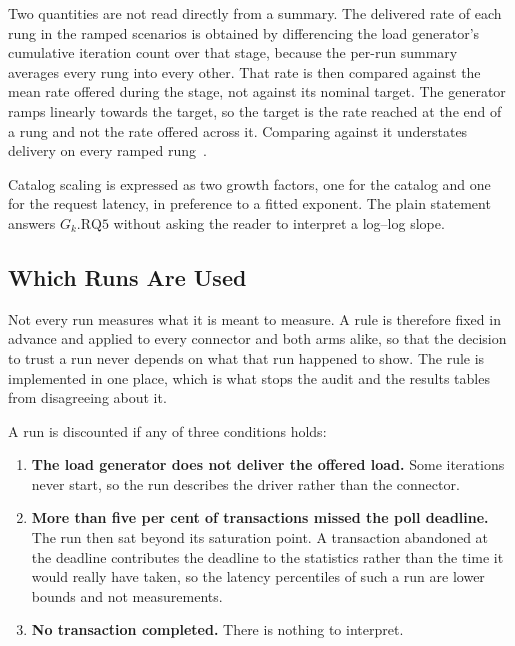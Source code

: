 \pagebreak

Two quantities are not read directly from a summary. The delivered rate of each rung in the ramped scenarios is obtained by differencing the load generator's cumulative iteration count over that stage, because the per-run summary averages every rung into every other. That rate is then compared against the mean rate offered during the stage, not against its nominal target. The generator ramps linearly towards the target, so the target is the rate reached at the end of a rung and not the rate offered across it. Comparing against it understates delivery on every ramped rung~\citep{k6docs}.

Catalog scaling is expressed as two growth factors, one for the catalog and one for the request latency, in preference to a fitted exponent. The plain statement answers $G_k.\text{RQ}5$ without asking the reader to interpret a log--log slope.

\subsection{Which Runs Are Used}\label{subsec:runs-used}

Not every run measures what it is meant to measure. A rule is therefore fixed in advance and applied to every connector and both arms alike, so that the decision to trust a run never depends on what that run happened to show. The rule is implemented in one place, which is what stops the audit and the results tables from disagreeing about it.

A run is discounted if any of three conditions holds:

\begin{enumerate}[leftmargin=*, itemsep=2pt, topsep=4pt]
    \item \textbf{The load generator does not deliver the offered load.} Some iterations never start, so the run describes the driver rather than the connector.
    \item \textbf{More than five per cent of transactions missed the poll deadline.} The run then sat beyond its saturation point. A transaction abandoned at the deadline contributes the deadline to the statistics rather than the time it would really have taken, so the latency percentiles of such a run are lower bounds and not measurements.
    \item \textbf{No transaction completed.} There is nothing to interpret.
\end{enumerate}

